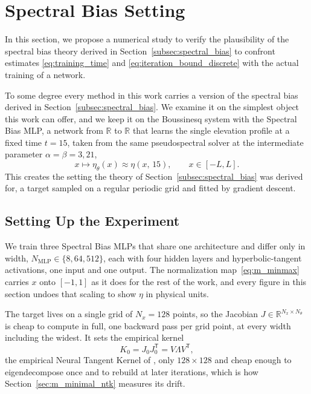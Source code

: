 \section{Spectral Bias Setting}
\label{sec:m_minimal}

In this section, we propose a numerical study to verify the plausibility of the spectral bias theory derived in Section~\ref{subsec:spectral_bias} to confront estimates \eqref{eq:training_time} and \eqref{eq:iteration_bound_discrete} with the actual training of a network. 

To some degree every method in this work carries a version of the spectral bias derived in Section~\ref{subsec:spectral_bias}. We examine it on the simplest object this work can offer, and we keep it on the Boussinesq system with the Spectral Bias MLP, a network from $\mathbb{R}$ to $\mathbb{R}$ that learns the single elevation profile at a fixed time $t = 15$, taken from the same pseudospectral solver at the intermediate parameter $\alpha = \beta = 3{,}21$,
\begin{equation}\label{eq:m_minimal_target}
    x \longmapsto \eta_\theta(x) \approx \eta(x,\, 15), \qquad x \in [-L, L].
\end{equation}
This creates the setting the theory of Section~\ref{subsec:spectral_bias} was derived for, a target sampled on a regular periodic grid and fitted by gradient descent. 

\subsection{Setting Up the Experiment}
\label{sec:m_minimal_setting}

We train three Spectral Bias MLPs that share one architecture and differ only in width, $N_{\mathrm{MLP}} \in \{8, 64, 512\}$, each with four hidden layers and hyperbolic-tangent activations, one input and one output. The normalization map~\eqref{eq:m_minmax} carries $x$ onto $[-1,1]$ as it does for the rest of the work, and every figure in this section undoes that scaling to show $\eta$ in physical units.

The target lives on a single grid of $N_x = 128$ points, so the Jacobian $J \in \mathbb{R}^{N_x \times N_\theta}$ is cheap to compute in full, one backward pass per grid point, at every width including the widest. It sets the empirical kernel
\begin{equation*}
    K_0 = J_0 J_0^{\mathsf{T}} = V \Lambda V^{\mathsf{T}},
\end{equation*}
the empirical Neural Tangent Kernel of \textcite{jacot2018}, only $128 \times 128$ and cheap enough to eigendecompose once and to rebuild at later iterations, which is how Section~\ref{sec:m_minimal_ntk} measures its drift.

